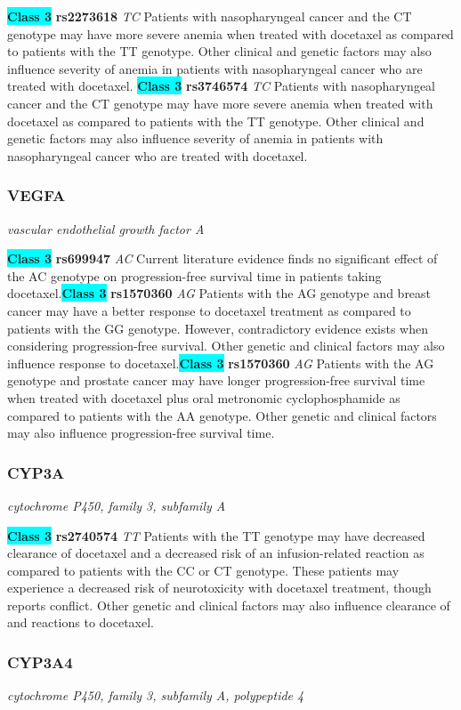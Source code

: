 \documentclass{report}
\begin{document}
\textbf{\colorbox{cyan} {Class 3}} \textbf{ rs2273618 } \textit{ TC }
Patients with nasopharyngeal cancer and the CT genotype may have more severe anemia when treated with docetaxel as compared to patients with the TT genotype. Other clinical and genetic factors may also influence severity of anemia in patients with nasopharyngeal cancer who are treated with docetaxel. \newline\textbf{\colorbox{cyan} {Class 3}} \textbf{ rs3746574 } \textit{ TC }
Patients with nasopharyngeal cancer and the CT genotype may have more severe anemia when treated with docetaxel as compared to patients with the TT genotype. Other clinical and genetic factors may also influence severity of anemia in patients with nasopharyngeal cancer who are treated with docetaxel.
\newline\subsubsection{ VEGFA }
\textit{ vascular endothelial growth factor A }

\textbf{\colorbox{cyan} {Class 3}} \textbf{ rs699947 } \textit{ AC }
Current literature evidence finds no significant effect of the AC genotype on progression-free survival time in patients taking docetaxel.\newline\textbf{\colorbox{cyan} {Class 3}} \textbf{ rs1570360 } \textit{ AG }
Patients with the AG genotype and breast cancer may have a better response to docetaxel treatment as compared to patients with the GG genotype. However, contradictory evidence exists when considering progression-free survival. Other genetic and clinical factors may also influence response to docetaxel.\newline\textbf{\colorbox{cyan} {Class 3}} \textbf{ rs1570360 } \textit{ AG }
Patients with the AG genotype and prostate cancer may have longer progression-free survival time when treated with docetaxel plus oral metronomic cyclophosphamide as compared to patients with the AA genotype. Other genetic and clinical factors may also influence progression-free survival time.\newline\subsubsection{ CYP3A }
\textit{ cytochrome P450, family 3, subfamily A }

\textbf{\colorbox{cyan} {Class 3}} \textbf{ rs2740574 } \textit{ TT }
Patients with the TT genotype may have decreased clearance of docetaxel and a decreased risk of an infusion-related reaction as compared to patients with the CC or CT genotype. These patients may experience a decreased risk of neurotoxicity with docetaxel treatment, though reports conflict. Other genetic and clinical factors may also influence clearance of and reactions to docetaxel.\newline\subsubsection{ CYP3A4 }
\textit{ cytochrome P450, family 3, subfamily A, polypeptide 4 }
\end{document}
